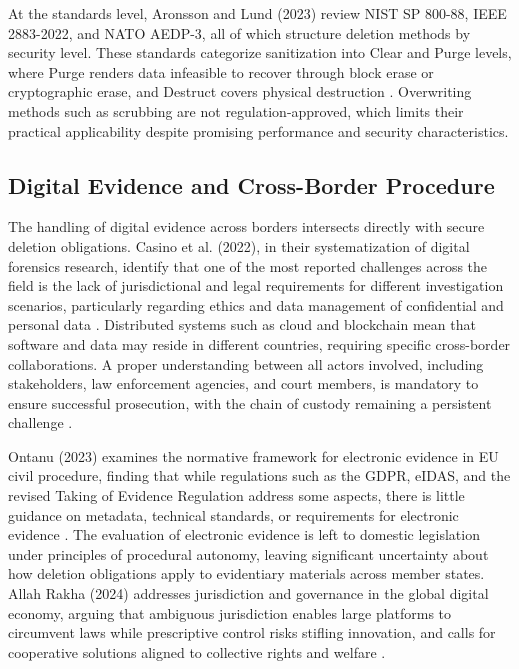 At the standards level, Aronsson and Lund (2023) review NIST SP 800-88, IEEE 2883-2022, and NATO 
AEDP-3, all of which structure deletion methods by security level. These standards categorize 
sanitization into Clear and Purge levels, where Purge renders data infeasible to recover through 
block erase or cryptographic erase, and Destruct covers physical destruction \cite{aronsson2025secure}.
Overwriting methods such as scrubbing are not regulation-approved, which limits their practical 
applicability despite promising performance and security characteristics.

\subsection{Digital Evidence and Cross-Border Procedure}
The handling of digital evidence across borders intersects directly with secure deletion obligations. 
Casino et al. (2022), in their systematization of digital forensics research, identify that one of 
the most reported challenges across the field is the lack of jurisdictional and legal requirements 
for different investigation scenarios, particularly regarding ethics and data management of 
confidential and personal data \cite{Casino2022Research}. Distributed systems such as cloud and 
blockchain mean that software and data may reside in different countries, requiring specific 
cross-border collaborations. A proper understanding between all actors involved, including 
stakeholders, law enforcement agencies, and court members, is mandatory to ensure successful 
prosecution, with the chain of custody remaining a persistent challenge \cite{Casino2022Research}.

Ontanu (2023) examines the normative framework for electronic evidence in EU civil procedure, 
finding that while regulations such as the GDPR, eIDAS, and the revised Taking of Evidence 
Regulation address some aspects, there is little guidance on metadata, technical standards, or 
requirements for electronic evidence \cite{Ontanu2023}. The evaluation of electronic evidence is 
left to domestic legislation under principles of procedural autonomy, leaving significant 
uncertainty about how deletion obligations apply to evidentiary materials across member states. 
Allah Rakha (2024) addresses jurisdiction and governance in the global digital economy, arguing 
that ambiguous jurisdiction enables large platforms to circumvent laws while prescriptive control 
risks stifling innovation, and calls for cooperative solutions aligned to collective rights and 
welfare \cite{AllahRakha2024}.


